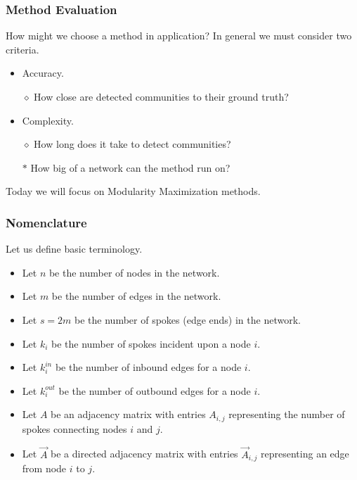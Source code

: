 \documentclass{beamer}
\begin{document}
\begin{frame}

    \frametitle{Method Evaluation}

    How might we choose a method in application? In general we must consider two criteria.\pause

    \vspace{2.5mm}
    \begin{itemize}
        \item Accuracy.\pause
        \item[$\diamond$] How close are detected communities to their ground truth?\pause
        \item Complexity.\pause
        \item[$\diamond$] How long does it take to detect communities?\pause
        \item[$\ast$] How big of a network can the method run on?\pause
    \end{itemize}

    \vspace{2.5mm}
    Today we will focus on Modularity Maximization methods. 

\end{frame}


\begin{frame}

    \frametitle{Nomenclature}

    Let us define basic terminology.\pause

    \vspace{5mm}
    \begin{itemize}
        \item Let $ n $ be the number of nodes in the network.\pause
        \item Let $ m $ be the number of edges in the network.\pause
        \item Let $ s = 2m $ be the number of spokes (edge ends) in the network.\pause
        \item Let $ k_{i} $ be the number of spokes incident upon a node $ i $.\pause
        \item Let $ k_{i}^{in} $ be the number of inbound edges for a node $ i $.\pause
        \item Let $ k_{i}^{out} $ be the number of outbound edges for a node $ i $.\pause
        \item Let $ A $ be an adjacency matrix with entries $ A_{i, j} $ representing the number of spokes connecting nodes $ i $ and $ j $.\pause
        \item Let $ \vec{A} $ be a directed adjacency matrix with entries $ \vec{A}_{i, j} $ representing an edge from node $ i $ to $ j $. 
    \end{itemize}

\end{frame}
\end{document}
